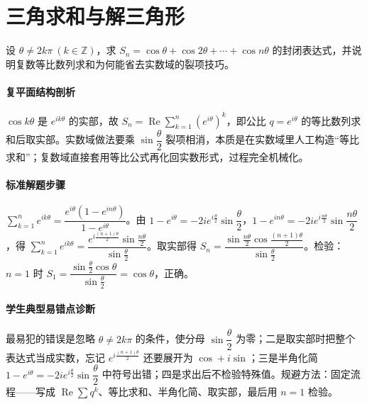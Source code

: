 \section{三角求和与解三角形}

\begin{problem}
设 $\theta\neq 2k\pi\ (k\in\mathbb{Z})$，求 $S_n=\cos\theta+\cos2\theta+\cdots+\cos n\theta$ 的封闭表达式，并说明复数等比数列求和为何能省去实数域的裂项技巧。
\end{problem}
\begin{solution}
\paragraph{复平面结构剖析}
$\cos k\theta$ 是 $e^{ik\theta}$ 的实部，故 $S_n=\operatorname{Re}\sum_{k=1}^n (e^{i\theta})^k$，即公比 $q=e^{i\theta}$ 的等比数列求和后取实部。实数域做法要乘 $\sin\dfrac{\theta}{2}$ 裂项相消，本质是在实数域里人工构造“等比求和”；复数域直接套用等比公式再化回实数形式，过程完全机械化。
\paragraph{标准解题步骤}
$\sum_{k=1}^n e^{ik\theta}=\dfrac{e^{i\theta}(1-e^{in\theta})}{1-e^{i\theta}}$。由 $1-e^{i\theta}=-2i e^{i\frac{\theta}{2}}\sin\dfrac{\theta}{2}$，$1-e^{in\theta}=-2i e^{i\frac{n\theta}{2}}\sin\dfrac{n\theta}{2}$，得 $\sum_{k=1}^n e^{ik\theta}=\dfrac{e^{i\frac{(n+1)\theta}{2}}\sin\frac{n\theta}{2}}{\sin\frac{\theta}{2}}$。取实部得 $S_n=\dfrac{\sin\frac{n\theta}{2}\cos\frac{(n+1)\theta}{2}}{\sin\frac{\theta}{2}}$。检验：$n=1$ 时 $S_1=\dfrac{\sin\frac{\theta}{2}\cos\theta}{\sin\frac{\theta}{2}}=\cos\theta$，正确。
\paragraph{学生典型易错点诊断}
最易犯的错误是忽略 $\theta\neq 2k\pi$ 的条件，使分母 $\sin\dfrac{\theta}{2}$ 为零；二是取实部时把整个表达式当成实数，忘记 $e^{i\frac{(n+1)\theta}{2}}$ 还要展开为 $\cos+i\sin$；三是半角化简 $1-e^{i\theta}=-2i e^{i\frac{\theta}{2}}\sin\dfrac{\theta}{2}$ 中符号出错；四是求出后不检验特殊值。规避方法：固定流程——写成 $\operatorname{Re}\sum q^k$、等比求和、半角化简、取实部，最后用 $n=1$ 检验。
\end{solution}

